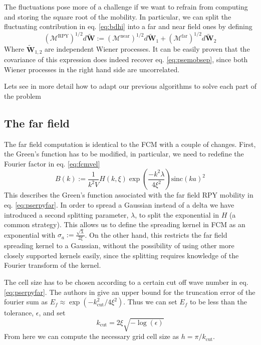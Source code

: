 \documentclass[ twoside,openright,titlepage,numbers=noenddot,%
headinclude,footinclude,cleardoublepage=empty,abstract=on,
BCOR=5mm,paper=a4,fontsize=11pt, dvipsnames
]{scrreprt}
\renewcommand{\vec}[1]{\bm{#1}}
\newcommand{\tens}[1]{\bm{\mathcal{#1}}}
\newcommand{\sinc}{\textrm{sinc}}
\newcommand{\near}{\textrm{near}}
\newcommand{\far}{\textrm{far}}
\newcommand{\noise}{\widetilde{W}}
\begin{document}
The fluctuations pose more of a challenge if we want to refrain from computing and storing the square root of the mobility. In particular, we can split the fluctuating contribution in eq. \eqref{eq:bdhi} into a far and near field ones by defining
\begin{equation}
  \label{eq:psenoise}
  (\tens{M}^{\textrm{RPY}})^{1/2} d\vec{\noise} :=  (\tens{M}^{\near})^{1/2} d\vec{\noise}_1 + (\tens{M}^{\far})^{1/2} d\vec{\noise}_2
\end{equation}
Where $\vec{\noise}_{1,2}$ are independent Wiener processes. It can be easily proven that the covariance of this expression does indeed recover eq. \eqref{eq:psemobsep}, since both Wiener processes in the right hand side are uncorrelated.

Lets see in more detail how to adapt our previous algorithms to solve each part of the problem

\subsection*{The far field}

The far field computation is identical to the \gls{FCM} with a couple of changes.
First, the Green's function has to be modified, in particular, we need to redefine the Fourier factor in eq. \eqref{eq:fcmvel}
\begin{equation}
  B(k) := \frac{1}{k^2V}H(k,\xi)\exp\left(\frac{-k^2\lambda}{4\xi^2}\right)\sinc(ka)^2
\end{equation}
This describes the Green's function associated with the far field \gls{RPY} mobility in eq. \eqref{eq:pserpyfar}. In order to spread a Gaussian instead of a delta we have introduced a second splitting parameter, $\lambda$, to split the exponential in $H$ (a common strategy\cite{Lindbo2011}\cite{Wang2016}). This allows us to define the spreading kernel in \gls{FCM} as an exponential with $\sigma_a := \frac{\sqrt{\lambda}}{2\xi}$. On the other hand, this restricts the far field spreading kernel to a Gaussian, without the possibility of using other more closely supported kernels easily, since the splitting requires knowledge of the Fourier transform of the kernel.

The cell size has to be chosen according to a certain cut off wave number in eq. \eqref{eq:pserpyfar}. The authors in \cite{Lindbo2010} give an upper bound for the truncation error of the fourier sum as $E_f \approx \exp(-k_{\textrm{cut}}^2/4\xi^2)$. Thus we can set $E_f$ to be less than the tolerance, $\epsilon$, and set
\begin{equation}
  k_{\textrm{cut}} = 2\xi\sqrt{-\log(\epsilon)}
\end{equation}
From here we can compute the necessary grid cell size as $h = \pi/k_{\textrm{cut}}$.
\end{document}
